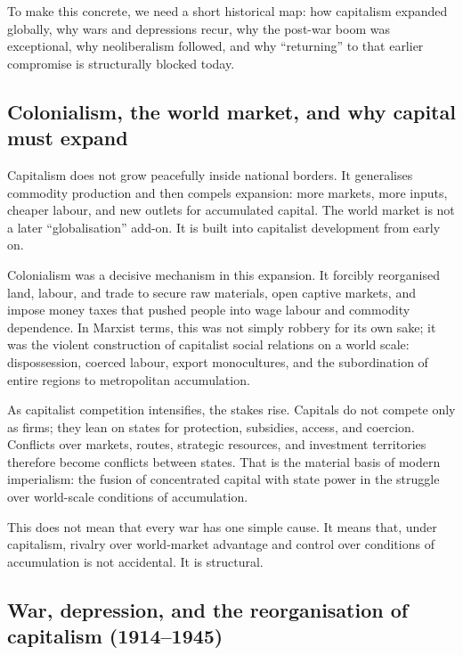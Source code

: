 To make this concrete, we need a short historical map: how capitalism expanded globally, why wars and depressions
recur, why the post-war boom was exceptional, why neoliberalism followed, and why ``returning'' to that earlier
compromise is structurally blocked today.

\setcounter{tocdepth}{1}

\subsection{Colonialism, the world market, and why capital must expand}
\label{subsec:colonialism-worldmarket}

Capitalism does not grow peacefully inside national borders. It generalises commodity production and then
compels expansion: more markets, more inputs, cheaper labour, and new outlets for accumulated capital.
The world market is not a later ``globalisation'' add-on. It is built into capitalist development from early on.

Colonialism was a decisive mechanism in this expansion. It forcibly reorganised land, labour, and trade to
secure raw materials, open captive markets, and impose money taxes that pushed people into wage labour and
commodity dependence. In Marxist terms, this was not simply robbery for its own sake; it was the violent
construction of capitalist social relations on a world scale: dispossession, coerced labour, export monocultures,
and the subordination of entire regions to metropolitan accumulation.

As capitalist competition intensifies, the stakes rise. Capitals do not compete only as firms; they lean on
states for protection, subsidies, access, and coercion. Conflicts over markets, routes, strategic resources, and
investment territories therefore become conflicts between states. That is the material basis of modern imperialism:
the fusion of concentrated capital with state power in the struggle over world-scale conditions of accumulation.

This does not mean that every war has one simple cause. It means that, under capitalism, rivalry over world-market
advantage and control over conditions of accumulation is not accidental. It is structural.

\subsection{War, depression, and the reorganisation of capitalism (1914--1945)}
\label{subsec:1914-1945}

